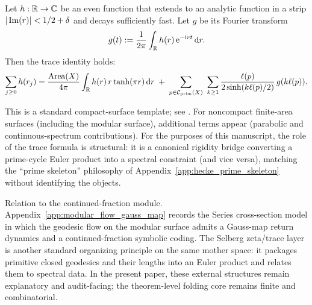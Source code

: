 \begin{theorem}
\label{thm:selberg_trace_formula_template}
\MathTag Let $h:\mathbb{R}\to\mathbb{C}$ be an even function that extends to an analytic function in a strip $|\operatorname{Im}(r)|<1/2+\delta$ and decays sufficiently fast.
Let $g$ be its Fourier transform
\[
g(t):=\frac{1}{2\pi}\int_{\mathbb{R}} h(r)\,\mathrm{e}^{-\mathrm{i} r t}\,\mathrm{d} r.
\]
Then the trace identity holds:
\[
\sum_{j\ge 0} h(r_j)
=\frac{\mathrm{Area}(X)}{4\pi}\int_{\mathbb{R}} h(r)\,r\tanh(\pi r)\,\mathrm{d} r
\;+\;\sum_{p\in\mathcal{C}_{\mathrm{prim}}(X)}\ \sum_{k\ge 1}\frac{\ell(p)}{2\sinh(k\ell(p)/2)}\,g(k\ell(p)).
\]
\end{theorem}
\begin{remark}
This is a standard compact-surface template; see \cite{Hejhal1983,Buser1992,Iwaniec2002}.
For noncompact finite-area surfaces (including the modular surface), additional terms appear (parabolic and continuous-spectrum contributions).
For the purposes of this manuscript, the role of the trace formula is structural: it is a canonical rigidity bridge converting a prime-cycle Euler product into a spectral constraint (and vice versa), matching the ``prime skeleton'' philosophy of Appendix~\ref{app:hecke_prime_skeleton} without identifying the objects.
\end{remark}

\AuditTag Relation to the continued-fraction module.
Appendix~\ref{app:modular_flow_gauss_map} records the Series cross-section model in which the geodesic flow on the modular surface admits a Gauss-map return dynamics and a continued-fraction symbolic coding.
The Selberg zeta/trace layer is another standard organizing principle on the same mother space: it packages primitive closed geodesics and their lengths into an Euler product and relates them to spectral data.
In the present paper, these external structures remain explanatory and audit-facing; the theorem-level folding core remains finite and combinatorial.


